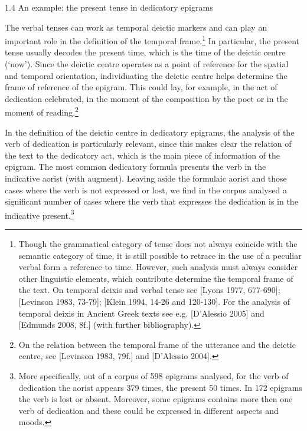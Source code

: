 \documentclass[amsthm,ebook]{saparticle}
\begin{document}
\bigskip


\bigskip


\bigskip


\bigskip


\bigskip

1.4 An example: the present tense in dedicatory epigrams

The verbal tenses can work as temporal deictic markers and can play an important role in the definition of the temporal
frame.\footnote{ Though the grammatical category of tense does not always coincide with the semantic category of time,
it is still possible to retrace in the use of a peculiar verbal form a reference to time. However, such analysis must
always consider other linguistic elements, which contribute determine the temporal frame of the text. On temporal
deixis and verbal tense see [Lyons 1977, 677-690]; [Levinson 1983, 73-79]; [Klein 1994, 14-26 and 120-130]. For the
analysis of temporal deixis in Ancient Greek texts see e.g. [D’Alessio 2005] and [Edmunds 2008, 8f.] (with further
bibliography).} In particular, the present tense usually decodes the present time, which is the time of the deictic
centre (‘now’). Since the deictic centre operates as a point of reference for the spatial and temporal orientation,
individuating the deictic centre helps determine the frame of reference of the epigram. This could lay, for example, in
the act of dedication celebrated, in the moment of the composition by the poet or in the moment of reading.\footnote{
On the relation between the temporal frame of the utterance and the deictic centre, see [Levinson 1983, 79f.] and
[D’Alessio 2004].} \ 

In the definition of the deictic centre in dedicatory epigrams, the analysis of the verb of dedication is particularly
relevant, since this makes clear the relation of the text to the dedicatory act, which is the main piece of information
of the epigram. The most common dedicatory formula presents the verb in the indicative aorist (with augment). Leaving
aside the formulaic aorist and those cases where the verb is not expressed or lost, we find in the corpus analysed a
significant number of cases where the verb that expresses the dedication is in the indicative present.\footnote{ More
specifically, out of a corpus of 598 epigrams analysed, for the verb of dedication the aorist appears 379 times, the
present 50 times. In 172 epigrams the verb is lost or absent. Moreover, some epigrams contains more then one verb of
dedication and these could be expressed in different aspects and moods. } 
\end{document}
